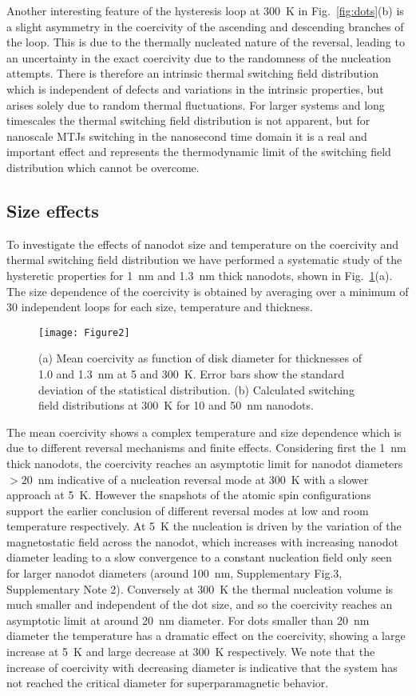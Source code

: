 \documentclass[aps,prb,signlecolumn,preprint,superscriptaddress,10]{revtex4-1}
\begin{document}
Another interesting feature of the hysteresis loop at 300~K in Fig.~\ref{fig:dots}(b) is a slight asymmetry in the coercivity of the ascending and descending branches of the loop. This is due to the thermally nucleated nature of the reversal, leading to an uncertainty in the exact coercivity due to the randomness of the nucleation attempts. There is therefore an intrinsic thermal switching field distribution which is independent of defects and variations in the intrinsic properties, but arises solely due to random thermal fluctuations. For larger systems and long timescales the thermal switching field distribution is not apparent, but for nanoscale MTJs switching in the nanosecond time domain it is a real and important effect and represents the thermodynamic limit of the switching field distribution which cannot be overcome. 

\subsection*{Size effects}
To investigate the effects of nanodot size and temperature on the coercivity and thermal switching field distribution we have performed a systematic study of the hysteretic properties for 1~nm and 1.3~nm thick nanodots, shown in Fig.~\ref{fig:SFD}(a). The size dependence of the coercivity is obtained by averaging over a minimum of 30 independent loops for each size, temperature and thickness.
%
\begin{figure}[!tb]
	\centering	\texttt{[image: Figure2]}	
	\caption{(a) Mean coercivity as function of disk diameter for thicknesses of 1.0 and 1.3~nm at 5 and 300~K. Error bars show the standard deviation of the statistical distribution. (b) Calculated switching field distributions at 300~K for 10 and 50~nm nanodots.}
	\label{fig:SFD}
\end{figure}
%
The mean coercivity shows a complex temperature and size dependence  which is due to different reversal mechanisms and finite effects. Considering first the 1~nm thick nanodots, the coercivity reaches an asymptotic limit for nanodot diameters $> 20$~nm indicative of a nucleation reversal mode at  300~K with a slower approach at 5~K. However the snapshots of the atomic spin configurations support the earlier conclusion of different reversal modes at low and room temperature respectively. At 5~K the nucleation is driven by the variation of the magnetostatic field across the nanodot, which increases with increasing nanodot diameter leading to a slow convergence to a constant nucleation field only seen for larger nanodot diameters (around 100~nm, Supplementary Fig.3, Supplementary Note 2). Conversely at 300~K the thermal nucleation volume is much smaller and independent of the dot size, and so the coercivity reaches an asymptotic limit at around 20~nm diameter. For dots smaller than 20~nm diameter the temperature has a dramatic effect on the coercivity, showing a large increase at 5~K and large decrease at 300~K respectively. We note that the increase of coercivity with decreasing diameter is indicative that the system has not reached the critical diameter for superparamagnetic behavior.
\end{document}
